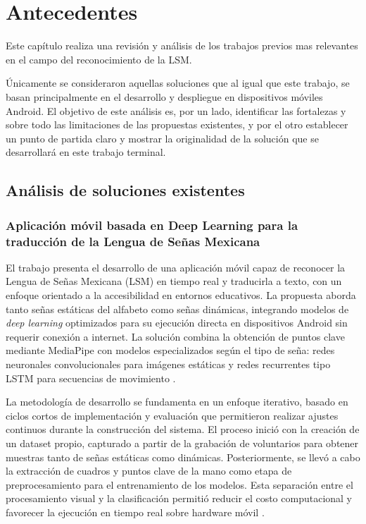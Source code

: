 	\section{Antecedentes}
	
	Este capítulo realiza una revisión y análisis de los trabajos previos mas relevantes en el campo del reconocimiento de la LSM. 
	 
	Únicamente se consideraron aquellas soluciones que al igual que este trabajo, se basan principalmente en el desarrollo y despliegue en dispositivos móviles Android. El objetivo de este análisis es, por un lado, identificar las fortalezas y sobre todo las limitaciones de las propuestas existentes, y por el otro establecer un punto de partida claro y mostrar la originalidad de la solución que se desarrollará en este trabajo terminal. 
	
	\subsection{Análisis de soluciones existentes}
	
	\subsubsection{Aplicación móvil basada en Deep Learning para la traducción de la Lengua de Señas Mexicana}
	
	El trabajo presenta el desarrollo de una aplicación móvil capaz de reconocer la Lengua de Señas Mexicana (LSM) en tiempo real y traducirla a texto, con un enfoque orientado a la accesibilidad en entornos educativos. La propuesta aborda tanto señas estáticas del alfabeto como señas dinámicas, integrando modelos de \textit{deep learning} optimizados para su ejecución directa en dispositivos Android sin requerir conexión a internet. La solución combina la obtención de puntos clave mediante MediaPipe con modelos especializados según el tipo de seña: redes neuronales convolucionales para imágenes estáticas y redes recurrentes tipo LSTM para secuencias de movimiento \cite{cuevas2025lsm_app}.
	
	La metodología de desarrollo se fundamenta en un enfoque iterativo, basado en ciclos cortos de implementación y evaluación que permitieron realizar ajustes continuos durante la construcción del sistema. El proceso inició con la creación de un dataset propio, capturado a partir de la grabación de voluntarios para obtener muestras tanto de señas estáticas como dinámicas. Posteriormente, se llevó a cabo la extracción de cuadros y puntos clave de la mano como etapa de preprocesamiento para el entrenamiento de los modelos. Esta separación entre el procesamiento visual y la clasificación permitió reducir el costo computacional y favorecer la ejecución en tiempo real sobre hardware móvil \cite{cuevas2025lsm_app}.
	
